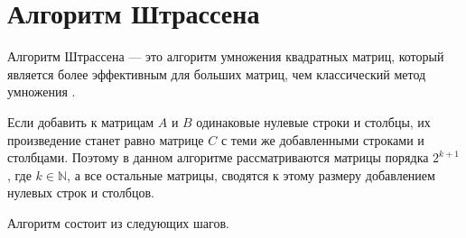 \section{Алгоритм Штрассена}

Алгоритм Штрассена --- это алгоритм умножения квадратных матриц, который является более эффективным для больших матриц, чем классический метод умножения \cite{strassen}.

Если добавить к матрицам $A$ и $B$ одинаковые нулевые строки и столбцы, их произведение станет равно матрице $C$ с теми же добавленными строками и столбцами. 
Поэтому в данном алгоритме рассматриваются матрицы порядка $2^{k + 1}$, где $ k \in \mathbb{N} $, а все остальные матрицы, сводятся к этому размеру добавлением нулевых строк и столбцов. 

Алгоритм состоит из следующих шагов.

